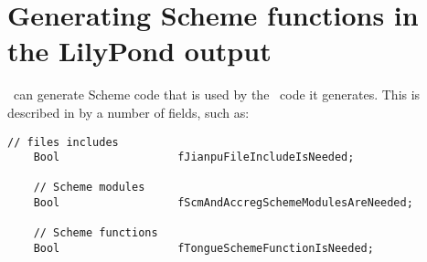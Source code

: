 \section{Generating Scheme functions in the LilyPond output}

\xmlToLy\ can generate Scheme code that is used by the \lily\ code it generates. This is described in  by a number of  fields, such as:
\begin{lstlisting}[language=CPlusPlus]
    // files includes
    Bool                  fJianpuFileIncludeIsNeeded;

    // Scheme modules
    Bool                  fScmAndAccregSchemeModulesAreNeeded;

    // Scheme functions
    Bool                  fTongueSchemeFunctionIsNeeded;
\end{lstlisting}




